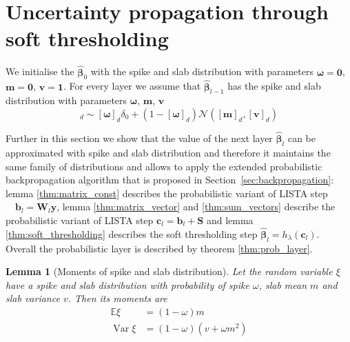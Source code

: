 \documentclass[letterpaper]{article}
\newtheorem{lemma}{Lemma}
\begin{document}
\section{Uncertainty propagation through soft thresholding}
We initialise the $\widehat{\boldsymbol\beta}_{0}$ with the spike and slab distribution with parameters $\boldsymbol\omega = \mathbf{0}$, $\mathbf{m} = \mathbf{0}$, $\mathbf{v} = \mathbf{1}$. For every layer we assume that $\widehat{\boldsymbol\beta}_{l-1}$ has the spike and slab distribution with parameters $\boldsymbol\omega$, $\mathbf{m}$, $\mathbf{v}$
\begin{equation}
[\boldsymbol\beta_{l-1}]_d \sim [\boldsymbol\omega]_d \delta_0 + (1 - [\boldsymbol\omega]_d)\mathcal{N}([\mathbf{m}]_d, [\mathbf{v}]_d)
\end{equation}

Further in this section we show that the value of the next layer $\widehat{\boldsymbol\beta}_l$ can be approximated with spike and slab distribution and therefore it maintains the same family of distributions and allows to apply the extended probabilistic backpropagation algorithm that is proposed in Section~\ref{sec:backpropagation}: lemma \ref{thm:matrix_const} describes the probabilistic variant of LISTA step $\quad \mathbf{b}_l = \mathbf{W}_l \mathbf{y}$, lemma \ref{thm:matrix_vector} and \ref{thm:sum_vectors} describe the probabilistic variant of LISTA step $ \mathbf{c}_l = \mathbf{b}_l +\mathbf{S}$ and lemma \ref{thm:soft_thresholding} describes the soft thresholding step $\widehat{\boldsymbol\beta}_{l} = h_\lambda(\mathbf{c}_l)$. Overall the probabilistic layer is described by theorem \ref{thm:prob_layer}.

\begin{lemma}[Moments of spike and slab distribution]
\label{thm:moments_spsl}
Let the random variable $\xi$ have a spike and slab distribution with probability of spike $\omega$, slab mean $m$ and slab variance $v$. Then its moments are
\begin{subequations}
\begin{align}
\mathbb{E}\xi &= (1-\omega)m \\
\operatorname{Var}\xi & = (1-\omega)(v + \omega m^2)
\end{align}
\end{subequations}
\end{lemma}
\end{document}
